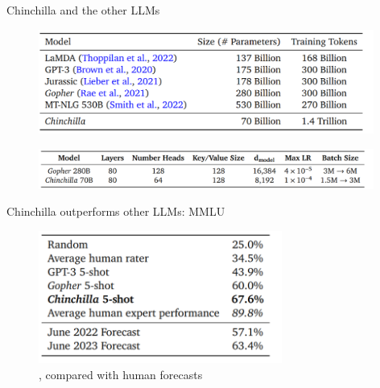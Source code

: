 
\begin{vbframe}{Chinchilla and the other LLM\MakeLowercase{s}}

\vfill

\begin{figure}
	\centering
	\includegraphics[width = 11cm]{./figure/llm_params.png} \\ 
\end{figure}

\begin{figure}
	\centering
	\includegraphics[width = 11cm]{./figure/chinchilla_gopher.png} \\ 
\end{figure}

\vfill

\end{vbframe}


\begin{vbframe}{Chinchilla outperforms other LLM\MakeLowercase{s}: MMLU}

\vfill

\begin{figure}
	\centering
	\includegraphics[width = 8cm]{./figure/chinchilla_mmlu.png} \\ 
	, compared
	with human forecasts
\end{figure}

\vfill

\end{vbframe}

